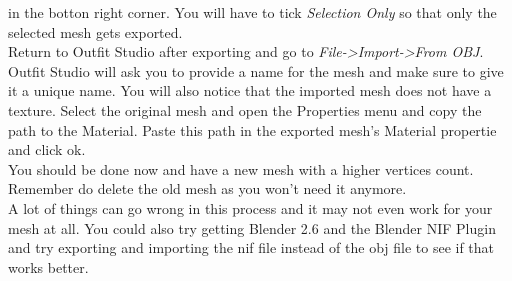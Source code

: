 in the botton right corner. You will have to tick \textit{Selection Only} so that only the selected mesh gets exported.\\
Return to Outfit Studio after exporting and go to \textit{File->Import->From OBJ}. Outfit Studio will ask you to provide a name for the 
mesh and make sure to give it a unique name. You will also notice that the imported mesh does not have a texture. Select the original 
mesh and open the Properties menu and copy the path to the Material. Paste this path in the exported mesh's Material propertie and click ok.\\
You should be done now and have a new mesh with a higher vertices count. Remember do delete the old mesh as you won't need it anymore.\\
A lot of things can go wrong in this process and it may not even work for your mesh at all. You could also try getting Blender 2.6 and the 
Blender NIF Plugin and try exporting and importing the nif file instead of the obj file to see if that works better.